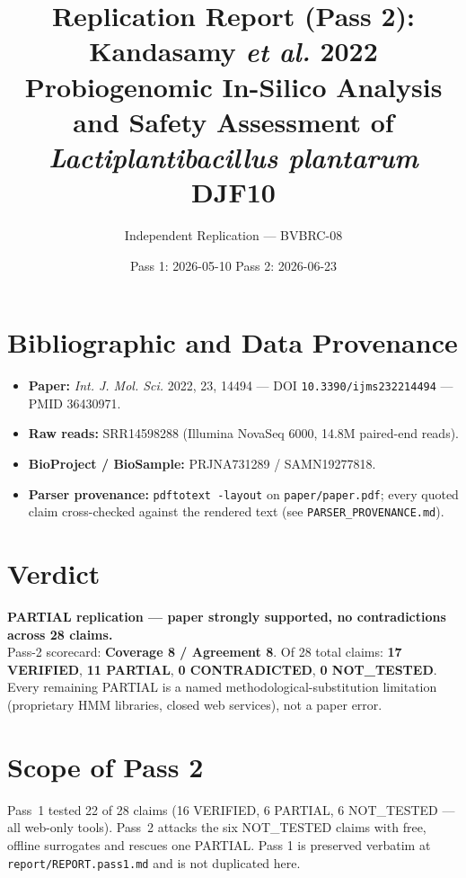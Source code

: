 \documentclass[11pt]{article}
\title{Replication Report (Pass 2): Kandasamy \emph{et al.} 2022 \\
\large Probiogenomic In-Silico Analysis and Safety Assessment of \emph{Lactiplantibacillus plantarum} DJF10}
\author{Independent Replication --- BVBRC-08}
\date{Pass 1: 2026-05-10 \quad Pass 2: 2026-06-23}
\begin{document}
\maketitle

\section*{Bibliographic and Data Provenance}
\begin{itemize}[leftmargin=1.5em]
  \item \textbf{Paper:} \emph{Int. J. Mol. Sci.} 2022, 23, 14494 --- DOI \texttt{10.3390/ijms232214494} --- PMID 36430971.
  \item \textbf{Raw reads:} SRR14598288 (Illumina NovaSeq 6000, 14.8M paired-end reads).
  \item \textbf{BioProject / BioSample:} PRJNA731289 / SAMN19277818.
  \item \textbf{Parser provenance:} \texttt{pdftotext -layout} on \texttt{paper/paper.pdf}; every quoted claim cross-checked against the rendered text (see \texttt{PARSER\_PROVENANCE.md}).
\end{itemize}

\section*{Verdict}
\textbf{PARTIAL replication --- paper strongly supported, no contradictions across 28 claims.} \\
Pass-2 scorecard: \textbf{Coverage 8 / Agreement 8}. Of 28 total claims: \textbf{17 VERIFIED}, \textbf{11 PARTIAL}, \textbf{0 CONTRADICTED}, \textbf{0 NOT\_TESTED}. Every remaining PARTIAL is a named methodological-substitution limitation (proprietary HMM libraries, closed web services), not a paper error.

\section{Scope of Pass 2}
Pass~1 tested 22 of 28 claims (16 VERIFIED, 6 PARTIAL, 6 NOT\_TESTED --- all web-only tools). Pass~2 attacks the six NOT\_TESTED claims with free, offline surrogates and rescues one PARTIAL. Pass 1 is preserved verbatim at \texttt{report/REPORT.pass1.md} and is not duplicated here.
\end{document}
